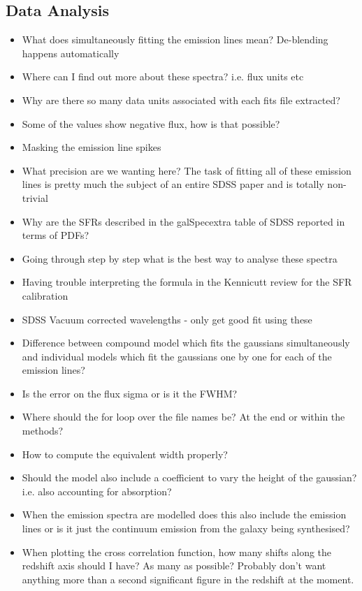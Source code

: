 \documentclass{literature}
\begin{document}
\subsection{Data Analysis}\label{que:data_analysis}
\begin{itemize}
	\item What does simultaneously fitting the emission lines mean? De-blending happens automatically
	\item Where can I find out more about these spectra? i.e. flux units etc 
	\item Why are there so many data units associated with each fits file extracted?
	\item Some of the values show negative flux, how is that possible?
	\item Masking the emission line spikes 
	\item What precision are we wanting here? The task of fitting all of these emission lines is pretty much the subject of an entire SDSS paper and is totally non-trivial
	\item Why are the SFRs described in the galSpecextra table of SDSS reported in terms of PDFs? 
	\item Going through step by step what is the best way to analyse these spectra
	\item Having trouble interpreting the formula in the Kennicutt review for the SFR calibration
	\item SDSS Vacuum corrected wavelengths - only get good fit using these
	\item Difference between compound model which fits the gaussians simultaneously and individual models which fit the gaussians one by one for each of the emission lines? 
	\item Is the error on the flux sigma or is it the FWHM? 
	\item Where should the for loop over the file names be? At the end or within the methods? 
	\item How to compute the equivalent width properly? 
	\item Should the model also include a coefficient to vary the height of the gaussian? i.e. also accounting for absorption?
	\item When the emission spectra are modelled does this also include the emission lines or is it just the continuum emission from the galaxy being synthesised?
	\item When plotting the cross correlation function, how many shifts along the redshift axis should I have? As many as possible? Probably don't want anything more than a second significant figure in the redshift at the moment.	

\end{itemize}
\end{document}
